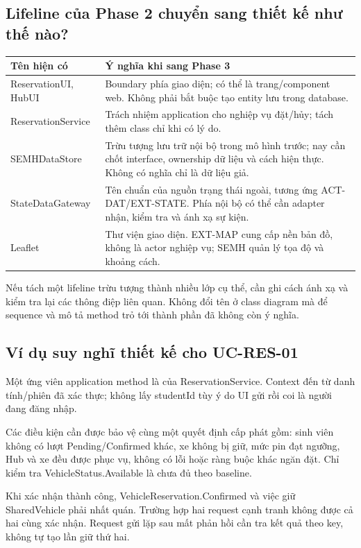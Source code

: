 \subsection{Lifeline của Phase 2 chuyển sang thiết kế như thế nào?}
\begin{center}\begin{tabularx}{\linewidth}{|L{37mm}|Y|}\hline
\textbf{Tên hiện có} & \textbf{Ý nghĩa khi sang Phase 3}\\\hline
ReservationUI, HubUI & Boundary phía giao diện; có thể là trang/component web. Không phải bắt buộc tạo entity lưu trong database.\\\hline
ReservationService & Trách nhiệm application cho nghiệp vụ đặt/hủy; tách thêm class chỉ khi có lý do.\\\hline
SEMHDataStore & Trừu tượng lưu trữ nội bộ trong mô hình trước; nay cần chốt interface, ownership dữ liệu và cách hiện thực. Không có nghĩa chỉ là dữ liệu giả.\\\hline
StateDataGateway & Tên chuẩn của nguồn trạng thái ngoài, tương ứng ACT-DAT/EXT-STATE. Phía nội bộ có thể cần adapter nhận, kiểm tra và ánh xạ sự kiện.\\\hline
Leaflet & Thư viện giao diện. EXT-MAP cung cấp nền bản đồ, không là actor nghiệp vụ; SEMH quản lý tọa độ và khoảng cách.\\\hline
\end{tabularx}\end{center}

Nếu tách một lifeline trừu tượng thành nhiều lớp cụ thể, cần ghi cách ánh xạ và kiểm tra lại các thông điệp liên quan. Không đổi tên ở class diagram mà để sequence và mô tả method trỏ tới thành phần đã không còn ý nghĩa.

\subsection{Ví dụ suy nghĩ thiết kế cho UC-RES-01}
Một ứng viên application method là  của ReservationService. Context đến từ danh tính/phiên đã xác thực; không lấy studentId tùy ý do UI gửi rồi coi là người đang đăng nhập.

Các điều kiện cần được bảo vệ cùng một quyết định cấp phát gồm: sinh viên không có lượt Pending/Confirmed khác, xe không bị giữ, mức pin đạt ngưỡng, Hub và xe đều được phục vụ, không có lỗi hoặc ràng buộc khác ngăn đặt. Chỉ kiểm tra VehicleStatus.Available là chưa đủ theo baseline.

Khi xác nhận thành công, VehicleReservation.Confirmed và việc giữ SharedVehicle phải nhất quán. Trường hợp hai request cạnh tranh không được cả hai cùng xác nhận. Request gửi lặp sau mất phản hồi cần tra kết quả theo key, không tự tạo lần giữ thứ hai.

